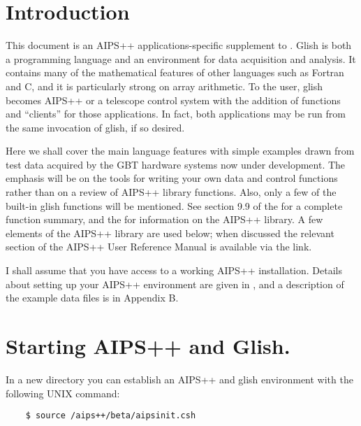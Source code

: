 

\section{Introduction} 

This document is an AIPS++ applications-specific supplement to
.  Glish is both a
programming language and an environment for data acquisition and
analysis.  It contains many of the mathematical features of other
languages such as Fortran and C, and it is particularly strong on
array arithmetic.  To the user, glish becomes AIPS++ or a telescope
control system with the addition of functions and ``clients'' for those
applications.  In fact, both applications may be run from the same
invocation of glish, if so desired.

Here we shall cover the main language features with simple examples
drawn from test data acquired by the GBT hardware systems now under
development.  The emphasis will be on the tools for writing your own
data and control functions rather than on a review of AIPS++ library
functions.  Also, only a few of the built-in glish functions will be
mentioned.  See section 9.9 of the
 for a
complete function summary, and the  for information on the
AIPS++ library. A few elements of the AIPS++ library are used
below; when discussed the relevant section of the AIPS++ User
Reference Manual is available via the link.

I shall assume that you have access to a working AIPS++ installation.
Details about setting up your AIPS++ environment are given in 
, 
and a description of the example data files is in Appendix B.

\section{Starting AIPS++ and Glish.}

    In a new directory you can establish an AIPS++ and glish environment
with the following UNIX command:

\begin{verbatim}
	$ source /aips++/beta/aipsinit.csh
\end{verbatim}

